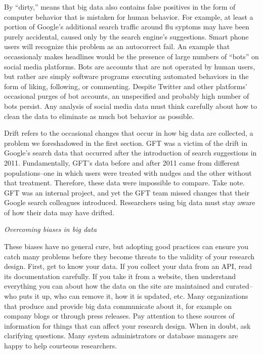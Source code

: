 \documentclass[12pt,]{article}
\begin{document}
By ``dirty,'' \citet{salganik17} means that big data also contains false
positives in the form of computer behavior that is mistaken for human
behavior. For example, at least a portion of Google's additional search
traffic around flu syptoms may have been purely accidental, caused only
by the search engine's suggestions. Smart phone users will recognize
this problem as an autocorrect fail. An example that occassionaly makes
headlines would be the presence of large numbers of ``bots'' on social
media platforms. Bots are accounts that are not operated by human users,
but rather are simply software programs executing automated behaviors in
the form of liking, following, or commenting. Despite Twitter and other
platforms' occasional purges of bot accounts, an unspecified and
probably high number of bots persist. Any analysis of social media data
must think carefully about how to clean the data to eliminate as much
bot behavior as possible.

Drift refers to the occasional changes that occur in how big data are
collected, a problem we foreshadowed in the first section. GFT was a
victim of the drift in Google's search data that occurred after the
introduction of search suggestions in 2011. Fundamentally, GFT's data
before and after 2011 came from different populations--one in which
users were treated with nudges and the other without that treatment.
Therefore, these data were impossible to compare. Take note. GFT was an
internal project, and yet the GFT team missed changes that their Google
search colleagues introduced. Researchers using big data must stay aware
of how their data may have drifted.

\emph{Overcoming biases in big data}

These biases have no general cure, but adopting good practices can
ensure you catch many problems before they become threats to the
validity of your research design. First, get to know your data. If you
collect your data from an API, read its documentation carefully. If you
take it from a website, then understand everything you can about how the
data on the site are maintained and curated--who puts it up, who can
remove it, how it is updated, etc. Many organizations that produce and
provide big data communicate about it, for example on company blogs or
through press releases. Pay attention to these sources of information
for things that can affect your research design. When in doubt, ask
clarifying questions. Many system administrators or database managers
are happy to help courteous researchers.
\end{document}
